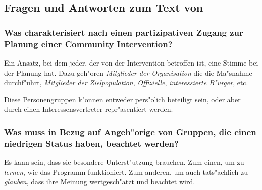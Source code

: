 \subsection{Fragen und Antworten zum Text von \textcite{rabinowitz_section_2013}}
\subsubsection{Was charakterisiert nach \textcite{rabinowitz_section_2013} einen partizipativen Zugang zur Planung einer Community Intervention?}
Ein Ansatz, bei dem jeder, der von der Intervention betroffen ist, eine Stimme bei der Planung hat. Dazu geh"oren \emph{Mitglieder der Organisation} die die Ma"snahme durchf"uhrt, \emph{Mitglieder der Zielpopulation}, \emph{Offizielle}, \emph{interessierte B"urger}, etc.

Diese Personengruppen k"onnen entweder pers"olich beteiligt sein, oder aber durch einen Interessensvertreter repr"asentiert werden.

\subsubsection{Was muss in Bezug auf Angeh"orige von Gruppen, die einen niedrigen Status haben, beachtet werden?}
Es kann sein, dass sie besondere Unterst"utzung brauchen. Zum einen, um zu \emph{lernen}, wie das Programm funktioniert. Zum anderen, um auch tats"achlich zu \emph{glauben}, dass ihre Meinung wertgesch"atzt und beachtet wird.

